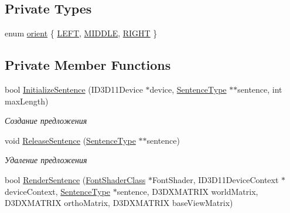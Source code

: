 \subsection*{Private Types}
\begin{DoxyCompactItemize}
\item 
enum \hyperlink{class_text_class_ae51cf75f517ece3d3ab028aa9db47531}{orient} \{ \hyperlink{class_text_class_ae51cf75f517ece3d3ab028aa9db47531a23dab4c79876766ff5cb02993e6cc490}{L\+E\+FT}, 
\hyperlink{class_text_class_ae51cf75f517ece3d3ab028aa9db47531aaaecc4cf54721ebf847ee446af62e4a1}{M\+I\+D\+D\+LE}, 
\hyperlink{class_text_class_ae51cf75f517ece3d3ab028aa9db47531aaa1c10c9e9d6b52a2be537cdd7e4e18b}{R\+I\+G\+HT}
 \}
\end{DoxyCompactItemize}
\subsection*{Private Member Functions}
\begin{DoxyCompactItemize}
\item 
bool \hyperlink{class_text_class_ac356b863bf52fe77725d2e1886bbca8c}{Initialize\+Sentence} (I\+D3\+D11\+Device $\ast$device, \hyperlink{struct_text_class_1_1_sentence_type}{Sentence\+Type} $\ast$$\ast$sentence, int max\+Length)
\begin{DoxyCompactList}\small\item\em Создание предложения \end{DoxyCompactList}\item 
void \hyperlink{class_text_class_a9f3c8844a5dc85a4a291620e1287fc1b}{Release\+Sentence} (\hyperlink{struct_text_class_1_1_sentence_type}{Sentence\+Type} $\ast$$\ast$sentence)
\begin{DoxyCompactList}\small\item\em Удаление предложения \end{DoxyCompactList}\item 
bool \hyperlink{class_text_class_af4d356655182c92f7342274383f30ec0}{Render\+Sentence} (\hyperlink{class_font_shader_class}{Font\+Shader\+Class} $\ast$Font\+Shader, I\+D3\+D11\+Device\+Context $\ast$device\+Context, \hyperlink{struct_text_class_1_1_sentence_type}{Sentence\+Type} $\ast$sentence, D3\+D\+X\+M\+A\+T\+R\+IX world\+Matrix, D3\+D\+X\+M\+A\+T\+R\+IX ortho\+Matrix, D3\+D\+X\+M\+A\+T\+R\+IX base\+View\+Matrix)
\end{DoxyCompactItemize}
